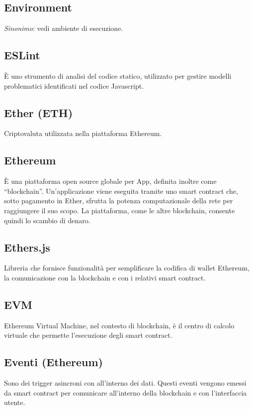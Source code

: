 	\subsection*{Environment}
	\emph{Sinonimo}: vedi ambiente di esecuzione.
	\subsection*{ESLint}
	È uno strumento di analisi del codice statico, utilizzato per gestire modelli problematici identificati nel codice Javascript.
	\subsection*{Ether (ETH)}
	Criptovaluta utilizzata nella piattaforma Ethereum.
	\subsection*{Ethereum}
	È una piattaforma open source globale per \DJ{}App, definita inoltre come “blockchain”. Un’applicazione viene eseguita tramite uno smart contract che, sotto pagamento in Ether, sfrutta la potenza computazionale della rete per raggiungere il suo scopo. La piattaforma, come le altre blockchain, consente quindi lo scambio di denaro.
	\subsection*{Ethers.js}
	Libreria che fornisce funzionalità per semplificare la codifica di wallet Ethereum, la comunicazione con la blockchain e con i relativi smart contract.
	\subsection*{EVM}
	Ethereum Virtual Machine, nel contesto di blockchain, è il centro di calcolo virtuale che permette l’esecuzione degli smart contract.
	\subsection*{Eventi (Ethereum)}
	Sono dei trigger asincroni con all’interno dei dati. Questi eventi vengono emessi da smart contract per comunicare all’interno della blockchain e con l’interfaccia utente.
